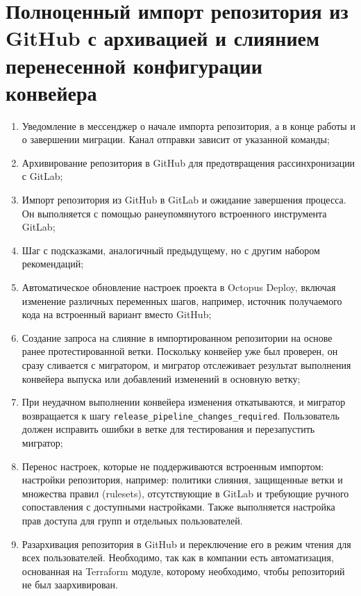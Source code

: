 \section{Полноценный импорт репозитория из GitHub с архивацией и слиянием перенесенной конфигурации конвейера} \label{sec:third-phase}

\begin{enumerate}
  \item Уведомление в мессенджер о начале импорта репозитория, а в конце работы и о завершении миграции.
        Канал отправки зависит от указанной команды;
  \item Архивирование репозитория в GitHub для предотвращения рассинхронизации с GitLab;
  \item Импорт репозитория из GitHub в GitLab и ожидание завершения процесса.
        Он выполняется с помощью ранеупомянутого встроенного инструмента GitLab;
  \item Шаг с подсказками, аналогичный предыдущему, но с другим набором рекомендаций;
  \item Автоматическое обновление настроек проекта в Octopus Deploy, включая изменение различных переменных шагов, например, источник получаемого кода на встроенный вариант вместо GitHub;
  \item Создание запроса на слияние в импортированном репозитории на основе ранее протестированной ветки.
        Поскольку конвейер уже был проверен, он сразу сливается с мигратором, и мигратор отслеживает результат выполнения конвейера выпуска или добавлений изменений в основную ветку;
  \item При неудачном выполнении конвейера изменения откатываются, и мигратор возвращается к шагу \texttt{release\_pipeline\_changes\_required}.
        Пользователь должен исправить ошибки в ветке для тестирования и перезапустить мигратор;
  \item Перенос настроек, которые не поддерживаются встроенным импортом: настройки репозитория, например: политики слияния, защищенные ветки и множества правил (rulesets), отсутствующие в GitLab и требующие ручного сопоставления с доступными настройками.
        Также выполняется настройка прав доступа для групп и отдельных пользователей.
  \item Разархивация репозитория в GitHub и переключение его в режим чтения для всех пользователей.
        Необходимо, так как в компании есть автоматизация, основанная на Terraform модуле, которому необходимо, чтобы репозиторий не был заархивирован.
\end{enumerate}
